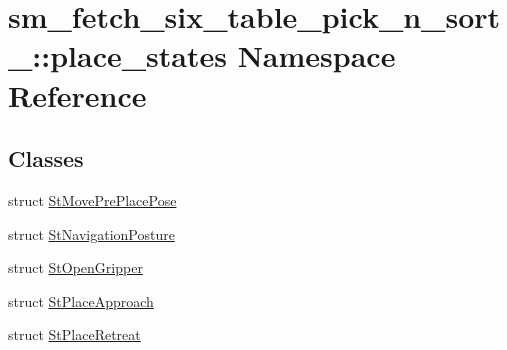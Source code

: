 \hypertarget{namespacesm__fetch__six__table__pick__n__sort__1_1_1place__states}{}\section{sm\+\_\+fetch\+\_\+six\+\_\+table\+\_\+pick\+\_\+n\+\_\+sort\+\_\+:\+:place\+\_\+states Namespace Reference}
\label{namespacesm__fetch__six__table__pick__n__sort__1_1_1place__states}
\subsection*{Classes}
\begin{DoxyCompactItemize}
\item 
struct \hyperlink{structsm__fetch__six__table__pick__n__sort__1_1_1place__states_1_1StMovePrePlacePose}{St\+Move\+Pre\+Place\+Pose}
\item 
struct \hyperlink{structsm__fetch__six__table__pick__n__sort__1_1_1place__states_1_1StNavigationPosture}{St\+Navigation\+Posture}
\item 
struct \hyperlink{structsm__fetch__six__table__pick__n__sort__1_1_1place__states_1_1StOpenGripper}{St\+Open\+Gripper}
\item 
struct \hyperlink{structsm__fetch__six__table__pick__n__sort__1_1_1place__states_1_1StPlaceApproach}{St\+Place\+Approach}
\item 
struct \hyperlink{structsm__fetch__six__table__pick__n__sort__1_1_1place__states_1_1StPlaceRetreat}{St\+Place\+Retreat}
\end{DoxyCompactItemize}
